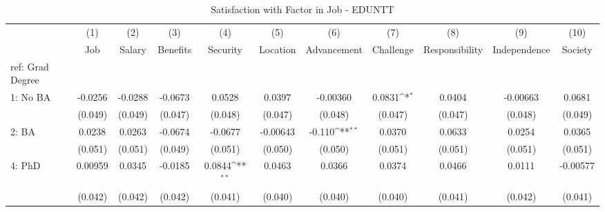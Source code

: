 \begin{table}[htbp]\centering
\def\sym#1{\ifmmode^{#1}\else\(^{#1}\)\fi}
\caption{Satisfaction with Factor in Job - EDUNTT \label{tab1}}
\begin{tabular}{l*{10}{c}}
\hline\hline
  &\multicolumn{1}{c}{(1)}&\multicolumn{1}{c}{(2)}&\multicolumn{1}{c}{(3)}&\multicolumn{1}{c}{(4)}&\multicolumn{1}{c}{(5)}&\multicolumn{1}{c}{(6)}&\multicolumn{1}{c}{(7)}&\multicolumn{1}{c}{(8)}&\multicolumn{1}{c}{(9)}&\multicolumn{1}{c}{(10)}\\
  &\multicolumn{1}{c}{Job}&\multicolumn{1}{c}{Salary}&\multicolumn{1}{c}{Benefits}&\multicolumn{1}{c}{Security}&\multicolumn{1}{c}{Location}&\multicolumn{1}{c}{Advancement}&\multicolumn{1}{c}{Challenge}&\multicolumn{1}{c}{Responsibility}&\multicolumn{1}{c}{Independence}&\multicolumn{1}{c}{Society}\\
\hline
ref: Grad Degree&                     &                     &                     &                     &                     &                     &                     &                     &                     &                     \\
[1em]
1: No BA&     -0.0256         &     -0.0288         &     -0.0673         &      0.0528         &      0.0397         &    -0.00360         &      0.0831\sym{*}  &      0.0404         &    -0.00663         &      0.0681         \\
  &     (0.049)         &     (0.049)         &     (0.047)         &     (0.048)         &     (0.047)         &     (0.048)         &     (0.047)         &     (0.047)         &     (0.048)         &     (0.049)         \\
[1em]
2: BA&      0.0238         &      0.0263         &     -0.0674         &     -0.0677         &    -0.00643         &      -0.110\sym{**} &      0.0370         &      0.0633         &      0.0254         &      0.0365         \\
  &     (0.051)         &     (0.051)         &     (0.049)         &     (0.051)         &     (0.050)         &     (0.050)         &     (0.051)         &     (0.051)         &     (0.051)         &     (0.051)         \\
[1em]
4: PhD&     0.00959         &      0.0345         &     -0.0185         &      0.0844\sym{**} &      0.0463         &      0.0366         &      0.0374         &      0.0466         &      0.0111         &    -0.00577         \\
  &     (0.042)         &     (0.042)         &     (0.042)         &     (0.041)         &     (0.040)         &     (0.040)         &     (0.040)         &     (0.041)         &     (0.042)         &     (0.041)         \\

\end{tabular}
\end{table}
